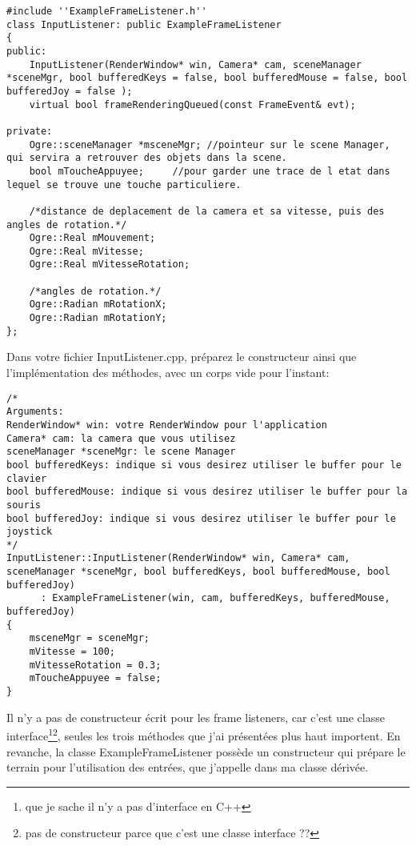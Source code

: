 \begin{lstlisting}[caption={InputListener.h}]
#include ''ExampleFrameListener.h''
class InputListener: public ExampleFrameListener
{
public:
    InputListener(RenderWindow* win, Camera* cam, sceneManager *sceneMgr, bool bufferedKeys = false, bool bufferedMouse = false, bool bufferedJoy = false );
    virtual bool frameRenderingQueued(const FrameEvent& evt);

private:
    Ogre::sceneManager *msceneMgr; //pointeur sur le scene Manager, qui servira a retrouver des objets dans la scene.
    bool mToucheAppuyee;	 //pour garder une trace de l etat dans lequel se trouve une touche particuliere.

    /*distance de deplacement de la camera et sa vitesse, puis des angles de rotation.*/
    Ogre::Real mMouvement;
    Ogre::Real mVitesse;
    Ogre::Real mVitesseRotation;

	/*angles de rotation.*/
    Ogre::Radian mRotationX;
    Ogre::Radian mRotationY;
};
\end{lstlisting}



Dans votre fichier InputListener.cpp, pr\'eparez le constructeur ainsi que l'impl\'ementation des m\'ethodes, avec un corps vide pour l'instant:

\begin{lstlisting}[caption={InputListener.cpp}]
/*
Arguments:
RenderWindow* win: votre RenderWindow pour l'application
Camera* cam: la camera que vous utilisez
sceneManager *sceneMgr: le scene Manager
bool bufferedKeys: indique si vous desirez utiliser le buffer pour le clavier
bool bufferedMouse: indique si vous desirez utiliser le buffer pour la souris
bool bufferedJoy: indique si vous desirez utiliser le buffer pour le joystick
*/
InputListener::InputListener(RenderWindow* win, Camera* cam, sceneManager *sceneMgr, bool bufferedKeys, bool bufferedMouse, bool bufferedJoy) 
      : ExampleFrameListener(win, cam, bufferedKeys, bufferedMouse, bufferedJoy)
{
    msceneMgr = sceneMgr;
    mVitesse = 100;
    mVitesseRotation = 0.3;
    mToucheAppuyee = false;
}
\end{lstlisting}



Il n'y a pas de constructeur \'ecrit pour les frame listeners, car c'est une classe interface\footnote{que je sache il n'y a pas d'interface en C++}\footnote{pas de constructeur parce que c'est une classe interface ??}, seules les trois m\'ethodes que j'ai pr\'esent\'ees plus haut importent. En revanche, la classe ExampleFrameListener poss\`ede un constructeur qui pr\'epare le terrain pour l'utilisation des entr\'ees, que j'appelle dans ma classe d\'eriv\'ee. 

